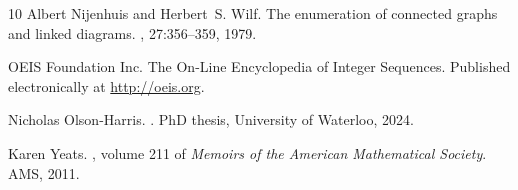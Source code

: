 \documentclass[oneside]{amsart}
\theoremstyle{definition}
\begin{document}
\begin{thebibliography}{10}
Albert Nijenhuis and Herbert~S. Wilf.
\newblock The enumeration of connected graphs and linked diagrams.
, 27:356--359, 1979.

{OEIS Foundation Inc.}
\newblock The {O}n-{L}ine {E}ncyclopedia of {I}nteger {S}equences.
\newblock Published electronically at \url{http://oeis.org}.

Nicholas Olson-Harris.
.
\newblock PhD thesis, University of Waterloo, 2024.

Karen Yeats.
, volume 211 of {\em
  Memoirs of the American Mathematical Society}.
\newblock AMS, 2011.

\end{thebibliography}
\end{document}
